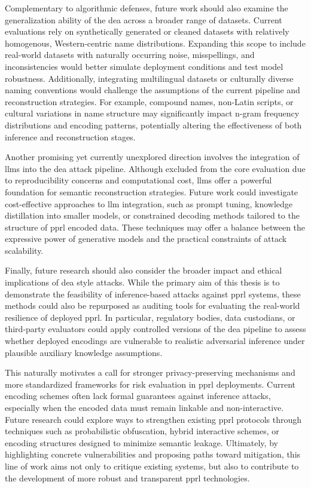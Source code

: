 Complementary to algorithmic defenses, future work should also examine the generalization ability of the \ac{dea} across a broader range of datasets.
Current evaluations rely on synthetically generated or cleaned datasets with relatively homogenous, Western-centric name distributions.
Expanding this scope to include real-world datasets with naturally occurring noise, misspellings, and inconsistencies would better simulate deployment conditions and test model robustness.
Additionally, integrating multilingual datasets or culturally diverse naming conventions would challenge the assumptions of the current pipeline and reconstruction strategies.
For example, compound names, non-Latin scripts, or cultural variations in name structure may significantly impact n-gram frequency distributions and encoding patterns, potentially altering the effectiveness of both inference and reconstruction stages.

Another promising yet currently unexplored direction involves the integration of \ac{llm}s into the \ac{dea} attack pipeline.
Although excluded from the core evaluation due to reproducibility concerns and computational cost, \ac{llm}s offer a powerful foundation for semantic reconstruction strategies.
Future work could investigate cost-effective approaches to \ac{llm} integration, such as prompt tuning, knowledge distillation into smaller models, or constrained decoding methods tailored to the structure of \ac{pprl} encoded data.
These techniques may offer a balance between the expressive power of generative models and the practical constraints of attack scalability.

Finally, future research should also consider the broader impact and ethical implications of \ac{dea} style attacks.
While the primary aim of this thesis is to demonstrate the feasibility of inference-based attacks against \ac{pprl} systems, these methods could also be repurposed as auditing tools for evaluating the real-world resilience of deployed \ac{pprl}.
In particular, regulatory bodies, data custodians, or third-party evaluators could apply controlled versions of the \ac{dea} pipeline to assess whether deployed encodings are vulnerable to realistic adversarial inference under plausible auxiliary knowledge assumptions.

This naturally motivates a call for stronger privacy-preserving mechanisms and more standardized frameworks for risk evaluation in \ac{pprl} deployments.
Current encoding schemes often lack formal guarantees against inference attacks, especially when the encoded data must remain linkable and non-interactive.
Future research could explore ways to strengthen existing \ac{pprl} protocols through techniques such as probabilistic obfuscation, hybrid interactive schemes, or encoding structures designed to minimize semantic leakage.
Ultimately, by highlighting concrete vulnerabilities and proposing paths toward mitigation, this line of work aims not only to critique existing systems, but also to contribute to the development of more robust and transparent \ac{pprl} technologies.


